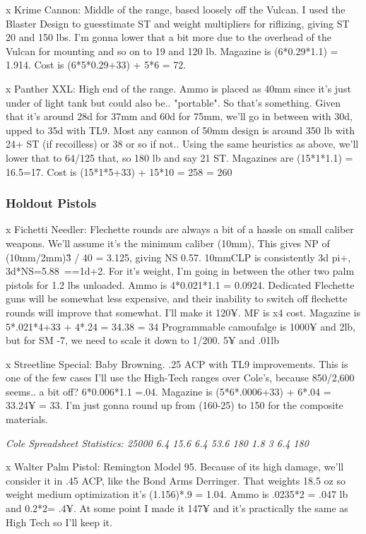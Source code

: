 \begin{multicols*}{2}
	x Krime Cannon: Middle of the range, based loosely off the Vulcan. I used the Blaster Design to guesstimate ST and weight multipliers for riflizing, giving ST 20 and 150 lbs. I'm gonna lower that a bit more due to the overhead of the Vulcan for mounting and so on to 19 and 120 lb. Magazine is (6*0.29*1.1) = 1.914. Cost is (6*5*0.29+33) + 5*6 = 72.
	
	x Panther XXL:  High end of the range. Ammo is placed as 40mm since it's just under of light tank but could also be.. "portable". So that's something. Given that it's around 28d for 37mm and 60d for 75mm, we'll go in between with 30d, upped to 35d with TL9. Most any cannon of 50mm design is around 350 lb with 24+ ST (if recoilless) or 38 or so if not.. Using the same heuristics as above, we'll lower that to 64/125 that, so 180 lb and say 21 ST. Magazines are (15*1*1.1) = 16.5=17. Cost is  (15*1*5+33) + 15*10 = 258 = 260
	
	\subsubsection{Holdout Pistols}
	
	x Fichetti Needler: Flechette rounds are always a bit of a hassle on small caliber weapons. We'll assume it's the minimum caliber (10mm), This gives NP of (10mm/2mm)\^3 / 40 = 3.125, giving NS 0.57. 10mmCLP is consistently 3d pi+, 3d*NS=5.88~==1d+2. For it's weight, I'm going in between the other two palm pistols for 1.2 lbs unloaded. Ammo is 4*0.021*1.1 = 0.0924. Dedicated Flechette guns will be somewhat less expensive, and their inability to switch off flechette rounds will improve that somewhat. I'll make it 120¥. MF is x4 cost. Magazine is 5*.021*4+33 + 4*.24 = 34.38 = 34  Programmable camoufalge is 1000¥ and 2lb, but for SM -7, we need to scale it down to 1/200. 5¥ and .01lb
	
	x Streetline Special: Baby Browning. .25 ACP with TL9 improvements. This is one of the few cases I'll use the High-Tech ranges over Cole's, because 850/2,600 seems.. a bit off? 6*0.006*1.1 =.04. Magazine is (5*6*.0006+33) + 6*.04 = 33.24¥ = 33. I'm just gonna round up from (160-25) to 150 for the composite materials.
	
	\textit{\textcolor{OliveGreen}{Cole Spreadsheet Statistics: 25000 6.4 15.6 6.4 53.6 180 1.8 3 6.4 180}}
	
	x Walter Palm Pistol: Remington Model 95. Because of its high damage, we'll consider it in .45 ACP, like the Bond Arms Derringer. That weights 18.5 oz so weight medium optimization it's (1.156)*.9 = 1.04. Ammo is .0235*2 = .047 lb and 0.2*2= .4¥. At some point I made it 147¥ and it's practically the same as High Tech so I'll keep it.
	

\end{multicols*}
